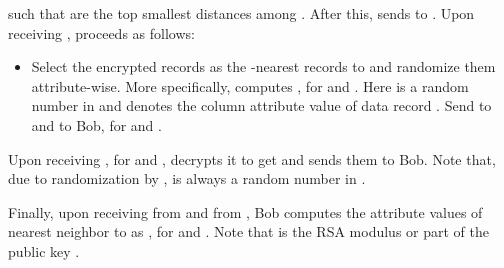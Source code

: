 \documentclass{article}
\begin{document}
such that  are the top  smallest distances 
among . After this,  sends  to . 
Upon receiving ,  proceeds as follows: 
\begin{itemize}
\item Select the encrypted records  as the -nearest 
records to  and randomize them attribute-wise. More specifically,  computes 
, for  and . 
Here  is a random number in  and  denotes the column  attribute 
value of data record . Send  to  and  to Bob, for  and . 
\end{itemize}
Upon receiving , for  and ,  decrypts it 
to get  and sends them to Bob. Note that, due to randomization 
by ,  is always a random number in .

Finally, upon receiving  from  and  from , 
Bob computes the attribute values of  nearest neighbor to  as 
, for  and . Note that 
 is the RSA modulus or part of the public key .
\end{document}
